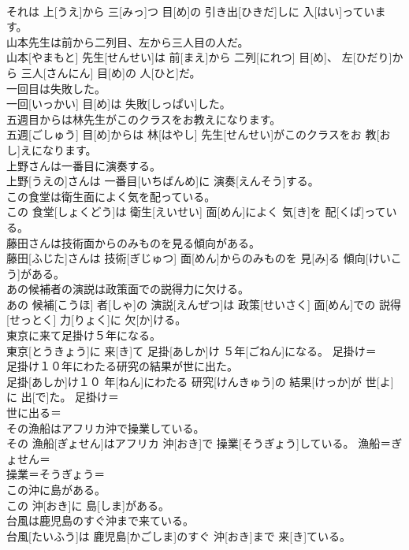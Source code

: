 \documentclass[8pt]{extreport}
\begin{document}
\begin{CJK}{UTF8}{min}
\\	それは 上[うえ]から 三[みっ]つ 目[め]の 引き出[ひきだ]しに 入[はい]っています。	
\\	山本先生は前から二列目、左から三人目の人だ。	
\\	山本[やまもと] 先生[せんせい]は 前[まえ]から 二列[にれつ] 目[め]、 左[ひだり]から 三人[さんにん] 目[め]の 人[ひと]だ。	
\\	一回目は失敗した。	
\\	一回[いっかい] 目[め]は 失敗[しっぱい]した。	
\\	五週目からは林先生がこのクラスをお教えになります。	
\\	五週[ごしゅう] 目[め]からは 林[はやし] 先生[せんせい]がこのクラスをお 教[おし]えになります。	
\\	上野さんは一番目に演奏する。	
\\	上野[うえの]さんは 一番目[いちばんめ]に 演奏[えんそう]する。	
\\	この食堂は衛生面によく気を配っている。	
\\	この 食堂[しょくどう]は 衛生[えいせい] 面[めん]によく 気[き]を 配[くば]っている。	
\\	藤田さんは技術面からのみものを見る傾向がある。	
\\	藤田[ふじた]さんは 技術[ぎじゅつ] 面[めん]からのみものを 見[み]る 傾向[けいこう]がある。	
\\	あの候補者の演説は政策面での説得力に欠ける。	
\\	あの 候補[こうほ] 者[しゃ]の 演説[えんぜつ]は 政策[せいさく] 面[めん]での 説得[せっとく] 力[りょく]に 欠[か]ける。	
\\	東京に来て足掛け５年になる。	
\\	東京[とうきょう]に 来[き]て 足掛[あしか]け ５年[ごねん]になる。	足掛け＝ 
\\	足掛け１０年にわたる研究の結果が世に出た。	
\\	足掛[あしか]け１０ 年[ねん]にわたる 研究[けんきゅう]の 結果[けっか]が 世[よ]に 出[で]た。	足掛け＝ 
\\	世に出る＝ 
\\	その漁船はアフリカ沖で操業している。	
\\	その 漁船[ぎょせん]はアフリカ 沖[おき]で 操業[そうぎょう]している。	漁船＝ぎょせん＝ 
\\	操業＝そうぎょう＝ 
\\	この沖に島がある。	
\\	この 沖[おき]に 島[しま]がある。	
\\	台風は鹿児島のすぐ沖まで来ている。	
\\	台風[たいふう]は 鹿児島[かごしま]のすぐ 沖[おき]まで 来[き]ている。	

\end{CJK}
\end{document}
